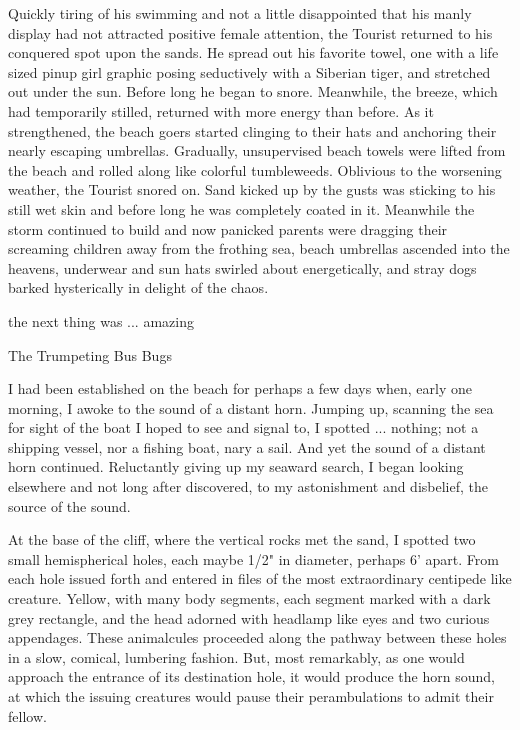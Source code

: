 \documentclass[10pt,twoside,openright]{memoir}
\begin{document}
Quickly tiring of his swimming and not a little disappointed that his manly display had not attracted positive female attention, the Tourist returned to his conquered spot upon the sands. He spread out his favorite towel, one with a life sized pinup girl graphic posing seductively with a Siberian tiger, and stretched out under the sun. Before long he began to snore. Meanwhile, the breeze, which had temporarily stilled, returned with more energy than before. As it strengthened, the beach goers started clinging to their hats and anchoring their nearly escaping umbrellas. Gradually, unsupervised beach towels were lifted from the beach and rolled along like colorful tumbleweeds. Oblivious to the worsening weather, the Tourist snored on. Sand kicked up by the gusts was sticking to his still wet skin and before long he was completely coated in it. Meanwhile the storm continued to build and now panicked parents were dragging their screaming children away from the frothing sea, beach umbrellas ascended into the heavens, underwear and sun hats swirled about energetically, and stray dogs barked hysterically in delight of the chaos.

the next thing was ... amazing

The Trumpeting Bus Bugs

I had been established on the beach for perhaps a few days when, early one morning, I awoke to the sound of a distant horn.  Jumping up, scanning the sea for sight of the boat I hoped to see and signal to, I spotted ... nothing; not a shipping vessel, nor a fishing boat, nary a sail.  And yet the sound of a distant horn continued.  Reluctantly giving up my seaward search, I began looking elsewhere and not long after discovered, to my astonishment and disbelief, the source of the sound.

At the base of the cliff, where the vertical rocks met the sand, I spotted two small hemispherical holes, each maybe 1/2" in diameter, perhaps 6' apart.  From each hole issued forth and entered in files of the most extraordinary centipede like creature.  Yellow, with many body segments, each segment marked with a dark grey rectangle, and the head adorned with headlamp like eyes and two curious appendages.  These animalcules proceeded along the pathway between these holes in a slow, comical, lumbering fashion.  But, most remarkably, as one would approach the entrance of its destination hole, it would produce the horn sound, at which the issuing creatures would pause their perambulations to admit their fellow.
\end{document}
